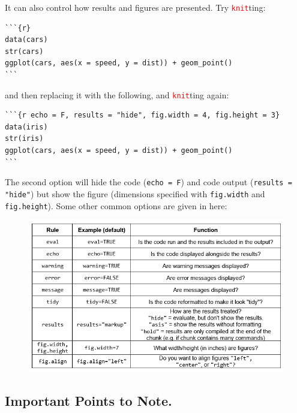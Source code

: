 \documentclass[a4paper,12pt]{article}
\newcommand\code[1]{\textcolor{red}{\texttt{#1}}}
\begin{document}
It can also control how results and figures are presented. Try \code{knit}ting:

\begin{shaded}
\begin{verbatim}
```{r}
data(cars)
str(cars)
ggplot(cars, aes(x = speed, y = dist)) + geom_point()
```
\end{verbatim}
\end{shaded}

and then replacing it with the following, and \code{knit}ting again:

\begin{shaded}
\begin{verbatim}
```{r echo = F, results = "hide", fig.width = 4, fig.height = 3}
data(iris)
str(iris)
ggplot(cars, aes(x = speed, y = dist)) + geom_point()
```
\end{verbatim}
\end{shaded}

The second option will hide the code (\texttt{echo = F}) and code output (\texttt{results = "hide"}) but show the figure (dimensions specified with \texttt{fig.width} and \texttt{fig.height}). Some other common options are given in here:

\begin{figure}[h]
\centering 
\includegraphics[width=1\textwidth]{figs/markdownrulesv2.jpg}
\label{fig:markdownrules}
\end{figure} 

\vspace*{-1.5cm}

\subsection{Important Points to Note.}
\end{document}
